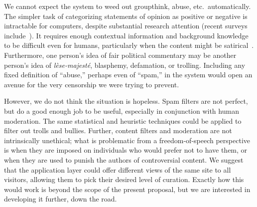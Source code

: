 \documentclass[oneside]{zarticle}
\begin{document}
We cannot expect the system to weed out groupthink, abuse,
etc.\ automatically.  The simpler task of categorizing statements of
opinion as positive or negative is intractable for computers, despite
substantial research attention (recent surveys
include~\textcite{liu2012mining,pang2008mining}).  It requires enough
contextual information and background knowledge to be difficult even
for humans, particularly when the content might be
satirical~\cite{lamarre2009satire}.  Furthermore, one person's idea of
fair political commentary may be another person's idea of
\textit{lèse-majesté}, blasphemy, defamation, or trolling.  Including
any fixed definition of “abuse,” perhaps even of “spam,” in the system
would open an avenue for the very censorship we were trying to
prevent.

However, we do not think the situation is hopeless.  Spam filters are
not perfect, but do a good enough job to be useful, especially in
conjunction with human moderation.  The same statistical and heuristic
techniques could be applied to filter out trolls and bullies.
Further, content filters and moderation are not intrinsically
unethical; what is problematic from a freedom-of-speech perspective is
when they are imposed on individuals who would prefer not to have
them, or when they are used to punish the authors of controversial
content.  We suggest that the application layer could offer different
views of the same site to all visitors, allowing them to pick their
desired level of curation.  Exactly how this would work is beyond the
scope of the present proposal, but we are interested in developing it
further, down the road.

\printbibliography
\end{document}
